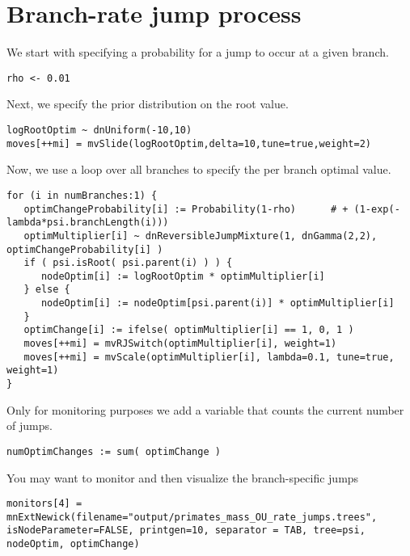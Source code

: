 \vspace{5cm}



\section{Branch-rate jump process}


We start with specifying a probability for a jump to occur at a given branch.
{\tt \small \begin{snugshade*}
\begin{lstlisting}
rho <- 0.01
\end{lstlisting}
\end{snugshade*}}

Next, we specify the prior distribution on the root value.
{\tt \small \begin{snugshade*}
\begin{lstlisting}
logRootOptim ~ dnUniform(-10,10)
moves[++mi] = mvSlide(logRootOptim,delta=10,tune=true,weight=2)
\end{lstlisting}
\end{snugshade*}}

Now, we use a loop over all branches to specify the per branch optimal value.
{\tt \small \begin{snugshade*}
\begin{lstlisting}
for (i in numBranches:1) {
   optimChangeProbability[i] := Probability(1-rho)      # + (1-exp(-lambda*psi.branchLength(i)))
   optimMultiplier[i] ~ dnReversibleJumpMixture(1, dnGamma(2,2), optimChangeProbability[i] )
   if ( psi.isRoot( psi.parent(i) ) ) {
      nodeOptim[i] := logRootOptim * optimMultiplier[i]
   } else {
      nodeOptim[i] := nodeOptim[psi.parent(i)] * optimMultiplier[i]
   }
   optimChange[i] := ifelse( optimMultiplier[i] == 1, 0, 1 )
   moves[++mi] = mvRJSwitch(optimMultiplier[i], weight=1)
   moves[++mi] = mvScale(optimMultiplier[i], lambda=0.1, tune=true, weight=1)
}
\end{lstlisting}
\end{snugshade*}}
Only for monitoring purposes we add a variable that counts the current number of jumps.
{\tt \small \begin{snugshade*}
\begin{lstlisting}
numOptimChanges := sum( optimChange )
\end{lstlisting}
\end{snugshade*}}
You may want to monitor and then visualize the branch-specific jumps
{\tt \small \begin{snugshade*}
\begin{lstlisting}
monitors[4] = mnExtNewick(filename="output/primates_mass_OU_rate_jumps.trees", isNodeParameter=FALSE, printgen=10, separator = TAB, tree=psi, nodeOptim, optimChange)
\end{lstlisting}
\end{snugshade*}}






